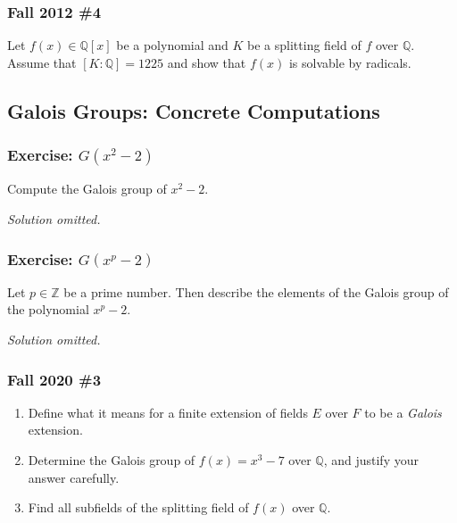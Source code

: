 \hypertarget{fall-2012-4}{%
\subsubsection{Fall 2012 \#4}\label{fall-2012-4}}

Let \(f(x) \in {\mathbb{Q}}[x]\) be a polynomial and \(K\) be a
splitting field of \(f\) over \({\mathbb{Q}}\). Assume that
\([K:{\mathbb{Q}}] = 1225\) and show that \(f(x)\) is solvable by
radicals.

\hypertarget{galois-groups-concrete-computations}{%
\subsection{Galois Groups: Concrete
Computations}\label{galois-groups-concrete-computations}}

\hypertarget{exercise-gx2-2}{%
\subsubsection{\texorpdfstring{Exercise:
\(G(x^2-2)\)}{Exercise: G(x\^{}2-2)}}\label{exercise-gx2-2}}

\begin{exercise}[?]

Compute the Galois group of \(x^2-2\).

\end{exercise}

\emph{Solution omitted.}

\hypertarget{exercise-gxp-2}{%
\subsubsection{\texorpdfstring{Exercise:
\(G(x^p-2)\)}{Exercise: G(x\^{}p-2)}}\label{exercise-gxp-2}}

\begin{exercise}[?]

Let \(p \in \mathbb{Z}\) be a prime number. Then describe the elements
of the Galois group of the polynomial \(x^{p}-2\).

\end{exercise}

\emph{Solution omitted.}

\hypertarget{fall-2020-3}{%
\subsubsection{Fall 2020 \#3}\label{fall-2020-3}}

\begin{enumerate}
\def\labelenumi{\alph{enumi}.}
\item
  Define what it means for a finite extension of fields \(E\) over \(F\)
  to be a \emph{Galois} extension.
\item
  Determine the Galois group of \(f(x) = x^3 - 7\) over
  \({\mathbb{Q}}\), and justify your answer carefully.
\item
  Find all subfields of the splitting field of \(f(x)\) over
  \({\mathbb{Q}}\).
\end{enumerate}

